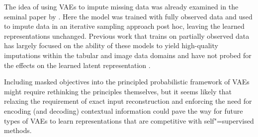 The idea of using VAEs to impute missing data was already examined in the seminal paper by \textcite{rezende_stochastic_2014}. Here the model was trained with fully observed data and used to impute data in an iterative sampling approach post hoc, leaving the learned representations unchanged.
Previous work that trains on partially observed data has largely focused on the ability of these models to yield high-quality imputations within the tabular and image data domains and have not probed for the effects on the learned latent representation \parencite{mattei_miwae_2019, ipsen_not-miwae_2021}. 

Including masked objectives into the principled probabilistic framework of VAEs might require rethinking the principles themselves, but it seems likely that relaxing the requirement of exact input reconstruction and enforcing the need for encoding (and decoding) contextual information could pave the way for future types of VAEs to learn representations that are competitive with self"=supervised methods.




















